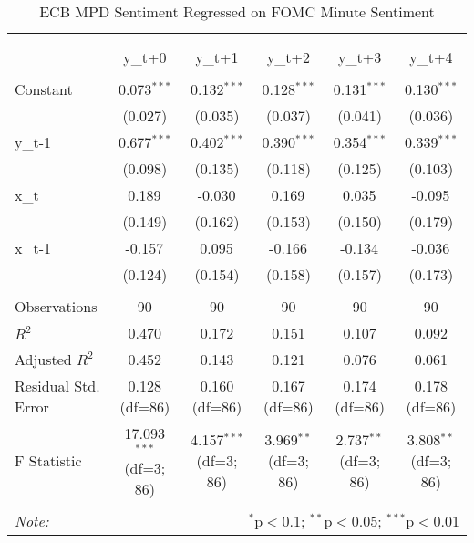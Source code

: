 \documentclass[12pt, letterpaper]{article}
\begin{document}
\begin{table}[H]
    \begin{adjustbox}{width=\textwidth}
    \centering
    \caption{ECB MPD Sentiment Regressed on FOMC Minute Sentiment}
    \begin{tabular}{@{\extracolsep{5pt}}lccccc}
    \\[-1.8ex]\hline
    \hline \\[-1.8ex]
    \\[-1.8ex] & \multicolumn{1}{c}{y_{t+0}} & \multicolumn{1}{c}{y_{t+1}} & \multicolumn{1}{c}{y_{t+2}} & \multicolumn{1}{c}{y_{t+3}} & \multicolumn{1}{c}{y_{t+4}}  \\
    \hline \\[-1.8ex]
     Constant & 0.073$^{***}$ & 0.132$^{***}$ & 0.128$^{***}$ & 0.131$^{***}$ & 0.130$^{***}$ \\
    & (0.027) & (0.035) & (0.037) & (0.041) & (0.036) \\
     y_{t-1} & 0.677$^{***}$ & 0.402$^{***}$ & 0.390$^{***}$ & 0.354$^{***}$ & 0.339$^{***}$ \\
    & (0.098) & (0.135) & (0.118) & (0.125) & (0.103) \\
     x_{t} & 0.189$^{}$ & -0.030$^{}$ & 0.169$^{}$ & 0.035$^{}$ & -0.095$^{}$ \\
    & (0.149) & (0.162) & (0.153) & (0.150) & (0.179) \\
     x_{t-1} & -0.157$^{}$ & 0.095$^{}$ & -0.166$^{}$ & -0.134$^{}$ & -0.036$^{}$ \\
    & (0.124) & (0.154) & (0.158) & (0.157) & (0.173) \\
    \hline \\[-1.8ex]
     Observations & 90 & 90 & 90 & 90 & 90 \\
     $R^2$ & 0.470 & 0.172 & 0.151 & 0.107 & 0.092 \\
     Adjusted $R^2$ & 0.452 & 0.143 & 0.121 & 0.076 & 0.061 \\
     Residual Std. Error & 0.128 (df=86) & 0.160 (df=86) & 0.167 (df=86) & 0.174 (df=86) & 0.178 (df=86) \\
     F Statistic & 17.093$^{***}$ (df=3; 86) & 4.157$^{***}$ (df=3; 86) & 3.969$^{**}$ (df=3; 86) & 2.737$^{**}$ (df=3; 86) & 3.808$^{**}$ (df=3; 86) \\
    \hline
    \hline \\[-1.8ex]
    \textit{Note:} & \multicolumn{5}{r}{$^{*}$p$<$0.1; $^{**}$p$<$0.05; $^{***}$p$<$0.01} \\
    \end{tabular}
    \end{adjustbox}
    \end{table}
\end{document}
